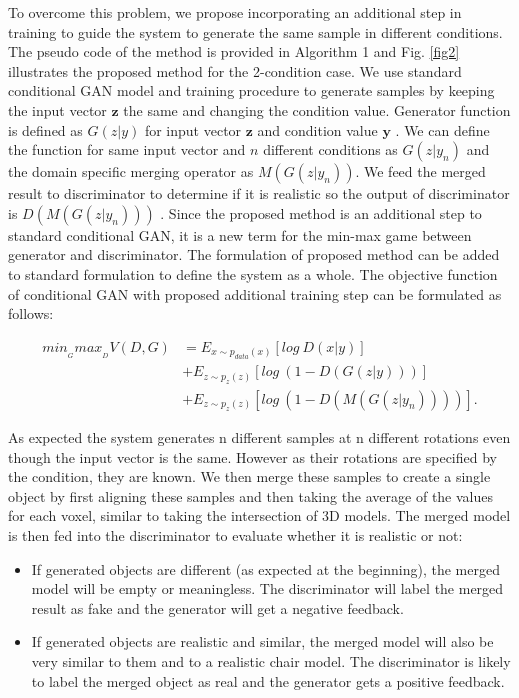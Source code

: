 \documentclass[runningheads]{llncs}
\begin{document}
	To overcome this problem, we propose incorporating an additional step in training to guide the system to generate the same sample in different conditions. The pseudo code of the method is provided in Algorithm 1 and Fig. \ref{fig2} illustrates the proposed method for the 2-condition case.  We use standard conditional GAN model and training procedure to generate samples by keeping the input vector $\mathbf{z}$ the same and changing the condition value.  Generator function is defined as $G(z|y)$ for input vector $\mathbf{z}$ and condition value $\mathbf{y}$ . We can define the function for same input vector and $n$ different conditions as $G(z|y_n)$ and the domain specific merging operator as $M(G(z|y_n))$. We feed the merged result to discriminator to determine if it is realistic so the output of discriminator is $D(M(G(z|y_n)))$ . Since the proposed method is an additional step to standard conditional GAN, it is a new term for the min-max game between generator and discriminator. The formulation of proposed method can be added to standard formulation to define the system as a whole. The objective function of conditional GAN with proposed additional training step can be formulated as follows: 

\begin{equation}
\begin{split}
min_{_{G}}max_{_{D}}V(D,G) &= E_{x\sim p_{data}(x)}[log~D(x|y)] \\
&+  E_{z\sim p_{z}(z)}[log~ (1-D(G(z|y)))] \\
&+  E_{z\sim p_{z}(z)}[log~ (1-D(M(G(z|y_{n}))))].
\end{split}
\end{equation}

As expected the system generates n different samples at n different rotations even though the input vector is the same.  However as their rotations are specified by the condition, they are known. We then merge these samples to create a single object by first aligning these samples and then taking the average of the values for each voxel, similar to taking the intersection of 3D models. The merged model is then fed into the discriminator to evaluate whether it is realistic or not:

\begin{itemize}
\item If generated objects are different (as expected at the beginning), the merged model will be empty or meaningless. The discriminator will label the merged result as fake and the generator will get a negative feedback.
\item If generated objects are realistic and similar, the merged model will also be very similar to them and to a realistic chair model. The discriminator is likely to label the merged object as real and the generator gets a positive feedback.
\end{itemize}
\end{document}
